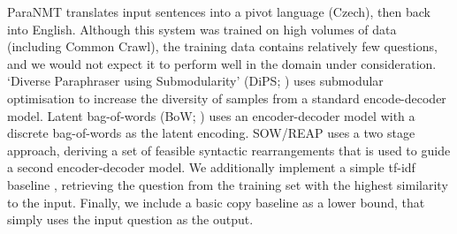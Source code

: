 \documentclass[11pt,a4paper]{article}
\begin{document}
ParaNMT \cite{wieting-gimpel-2018-paranmt} translates input sentences
into a pivot language (Czech), then back into English. Although this
system was trained on high volumes of data (including Common Crawl),
the training data contains relatively few questions, and we would not
expect it to perform well in the domain under consideration. `Diverse
Paraphraser using Submodularity' (DiPS;
\citealt{kumar-etal-2019-submodular}) uses submodular optimisation to
increase the diversity of samples from a standard encode-decoder
model. Latent bag-of-words (BoW; \citealt{latentbow}) uses an
encoder-decoder model with a discrete bag-of-words as the latent
encoding. SOW/REAP \cite{goyal_neural_2020} uses a two stage approach, deriving a set of feasible syntactic rearrangements that is used to guide a second encoder-decoder model. We additionally implement a simple \mbox{tf-idf} baseline
\cite{tfidf}, retrieving the question from the training set with the
highest similarity to the input. Finally, we include a basic copy
baseline as a lower bound, that simply uses the input question as the output.
\end{document}

